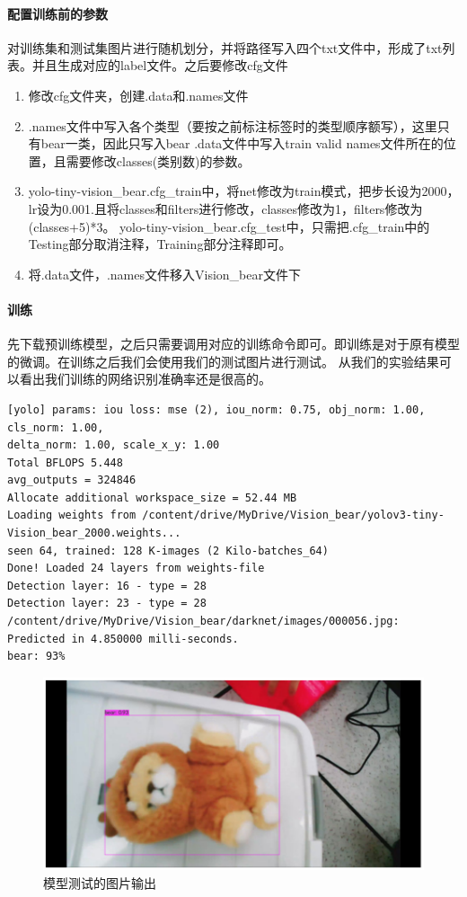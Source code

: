 \documentclass[a4paper,twoside]{article}
\begin{document}
\paragraph{配置训练前的参数}
对训练集和测试集图片进行随机划分，并将路径写入四个txt文件中，形成了txt列表。并且生成对应的label文件。之后要修改cfg文件
\begin{enumerate}
	\item 修改cfg文件夹，创建.data和.names文件
	\item .names文件中写入各个类型（要按之前标注标签时的类型顺序额写），这里只有bear一类，因此只写入bear
	      .data文件中写入train valid names文件所在的位置，且需要修改classes(类别数)的参数。
	\item yolo-tiny-vision\_bear.cfg\_train中，将net修改为train模式，把步长设为2000，
	      lr设为0.001.且将classes和filters进行修改，classes修改为1，filters修改为(classes+5)*3。
	      yolo-tiny-vision\_bear.cfg\_test中，只需把.cfg\_train中的Testing部分取消注释，Training部分注释即可。
	\item 将.data文件，.names文件移入Vision\_bear文件下
\end{enumerate}
\paragraph{训练}
先下载预训练模型，之后只需要调用对应的训练命令即可。即训练是对于原有模型的微调。在训练之后我们会使用我们的测试图片进行测试。
从我们的实验结果可以看出我们训练的网络识别准确率还是很高的。

\begin{lstlisting}[caption={模型测试输出}]
[yolo] params: iou loss: mse (2), iou_norm: 0.75, obj_norm: 1.00, cls_norm: 1.00, 
delta_norm: 1.00, scale_x_y: 1.00
Total BFLOPS 5.448 
avg_outputs = 324846 
Allocate additional workspace_size = 52.44 MB 
Loading weights from /content/drive/MyDrive/Vision_bear/yolov3-tiny-Vision_bear_2000.weights...
seen 64, trained: 128 K-images (2 Kilo-batches_64) 
Done! Loaded 24 layers from weights-file 
Detection layer: 16 - type = 28 
Detection layer: 23 - type = 28 
/content/drive/MyDrive/Vision_bear/darknet/images/000056.jpg: Predicted in 4.850000 milli-seconds.
bear: 93%
\end{lstlisting}
\begin{figure}[htbp]
	\begin{center}
		\includegraphics*[width=0.6\linewidth]{yolotest.png}
		\caption{模型测试的图片输出}
	\end{center}
\end{figure}
\end{document}
